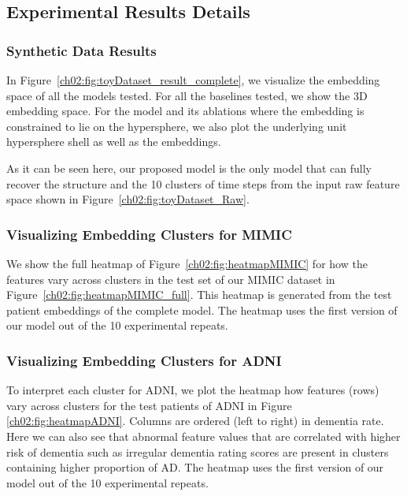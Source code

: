 \subsection{Experimental Results Details}
\label{ch02:sec:experimental-results-details}
\ChTwoHeadingOnly
\subsubsection{Synthetic Data Results}
\label{ch02:sec:ToyExperiment_Results}

In Figure~\ref{ch02:fig:toyDataset_result_complete}, we visualize the embedding space of all the models tested.
For all the baselines tested, we show the 3D embedding space.
For the  model and its ablations where the embedding is constrained to lie on the hypersphere, we also plot the underlying unit hypersphere shell as well as the embeddings.





As it can be seen here, our proposed model is the only model that can fully recover the structure and the 10 clusters of time steps from the input raw feature space shown in Figure~\ref{ch02:fig:toyDataset_Raw}.

\subsubsection{Visualizing Embedding Clusters for MIMIC}
\label{ch02:sec:heatmap_mimic}
We show the full heatmap of Figure~\ref{ch02:fig:heatmapMIMIC} for how the features vary across clusters in the test set of our MIMIC dataset in Figure~\ref{ch02:fig:heatmapMIMIC_full}.
This heatmap is generated from the test patient embeddings of the complete  model.
The heatmap uses the first version of our model out of the 10 experimental repeats.



\subsubsection{Visualizing Embedding Clusters for ADNI}
\label{ch02:sec:heatmap_adni}

To interpret each cluster for ADNI, we plot the heatmap how features (rows) vary across clusters for the test patients of ADNI in Figure \ref{ch02:fig:heatmapADNI}.
Columns are ordered (left to right) in dementia rate. 
Here we can also see that abnormal feature values that are correlated with higher risk of dementia such as irregular dementia rating scores are present in clusters containing higher proportion of AD.
The heatmap uses the first version of our model out of the 10 experimental repeats.




